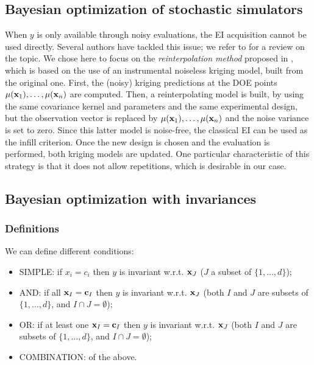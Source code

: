 	\subsection{Bayesian optimization of stochastic simulators}
	When $y$ is only available through noisy evaluations, the EI acquisition cannot be used directly.
	Several authors have tackled this issue; we refer to \cite{picheny2013benchmark} for a review on the topic.
	We chose here to focus on the \textit{reinterpolation method} proposed in \cite{forrester2006design}, which is based on the use of an instrumental noiseless kriging model, 
	built from the original one. First, the (noisy) kriging predictions at the DOE points $\mu(\mathbf{x}_1), \ldots, \mu(\mathbf{x}_n)$ are computed. 
	Then, a reinterpolating model is built, by using the same covariance kernel and parameters and the same experimental design, but
	the observation vector is replaced by $\mu(\mathbf{x}_1), \ldots, \mu(\mathbf{x}_n)$ and the noise variance is set to zero. Since this latter model is
	noise-free, the classical EI can be used as the infill criterion. Once the new design is chosen and the evaluation is performed,
	both kriging models are updated. One particular characteristic of this strategy is that it does not allow repetitions, which is desirable in our
	case.
	
	\subsection{Bayesian optimization with invariances}
	
	\subsubsection{Definitions}
	
	We can define different conditions:
	\begin{itemize}
		\item SIMPLE: if $x_i = c_i$ then $y$ is invariant w.r.t.  $\mathbf{x}_J$ ($J$ a subset of $\{1, \ldots, d\}$); 
		\item AND: if all $\mathbf{x}_I = \mathbf{c}_I$ then $y$ is invariant w.r.t.  $\mathbf{x}_J$ (both $I$ and $J$ are subsets of $\{1, \ldots, d\}$, and $I \cap J = \emptyset$);
		\item OR: if at least one $\mathbf{x}_I = \mathbf{c}_I$ then $y$ is invariant w.r.t.  $\mathbf{x}_J$ (both $I$ and $J$ are subsets of $\{1, \ldots, d\}$, and $I \cap J = \emptyset$);
		\item COMBINATION: of the above.
	\end{itemize}
	
